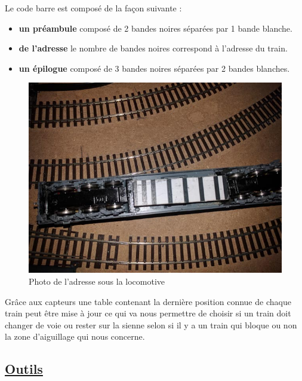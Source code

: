 Le code barre est compos\'e de la façon suivante :
\begin{itemize}
    \item \textbf{un pr\'eambule} compos\'e de 2 bandes noires
      s\'epar\'ees par 1 bande blanche.
    \item \textbf{de l'adresse} le nombre de bandes noires correspond
      à l'adresse du train. 
    \item \textbf{un \'epilogue} compos\'e de 3 bandes noires
      s\'epar\'ees par 2 bandes blanches.
\end{itemize}

\begin{figure}[h]
\centering
\includegraphics[scale=0.27]{add.jpg}
\caption{Photo de l'adresse sous la locomotive}
\label{fig6}
\end{figure}

Grâce aux capteurs une table contenant la
dernière position connue de chaque train peut être mise à jour ce qui va nous permettre de
choisir si un train doit changer de voie ou rester sur la sienne selon
si il y a un train qui bloque ou non la zone d'aiguillage qui nous concerne.


\subsection{\underline{Outils}}
\label{sec:outils}

